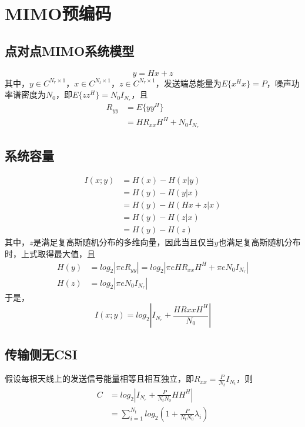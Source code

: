 \section{MIMO预编码}
\subsection{点对点MIMO系统模型}
\begin{equation}
    y=Hx+z
\end{equation}
其中，$y\in C^{N_r\times1}$，$x\in C^{N_t\times 1}$，$z\in C^{N_r\times1}$，发送端总能量为$E\{x^Hx\}=P$，噪声功率谱密度为$N_0$，即$E\{zz^H\}=N_0I_{N_r}$，且
\begin{equation}
    \begin{aligned}
        R_{yy}&=E\{yy^H\} \\
        &=HR_{xx}H^H+N_0I_{N_r}
    \end{aligned}
\end{equation}

\subsection{系统容量}
\begin{equation}
    \begin{aligned}
        I(x;y)&=H(x)-H(x|y)\\
        &=H(y)-H(y|x) \\
        &=H(y)-H(Hx+z|x) \\
        &=H(y)-H(z|x) \\
        &=H(y)-H(z)
    \end{aligned}
\end{equation}
其中，$z$是满足复高斯随机分布的多维向量，因此当且仅当$y$也满足复高斯随机分布时，上式取得最大值，且
\begin{equation}
\begin{aligned}
    H(y)&=log_2|\pi eR_{yy}| =log_2|\pi eHR_{xx}H^H+\pi eN_0I_{N_r}| \\
    H(z)&=log_2|\pi e N_0I_{N_r}|
\end{aligned}
\end{equation}
于是，
\begin{equation}
    I(x;y)=log_2\left|I_{N_r} + \frac{HR{xx}H^H}{N_0}\right|
\end{equation}

\subsection{传输侧无CSI}
假设每根天线上的发送信号能量相等且相互独立，即$R_{xx}=\frac{P}{N_t}I_{N_t}$，则
\begin{equation}
    \begin{aligned}
    C&=log_2\left|I_{N_r} + \frac{P}{N_tN_0}HH^H\right| \\
    &=\sum_{i=1}^{N_t}log_2(1+\frac{P}{N_tN_0}\lambda_i)
    \end{aligned}
\end{equation}

